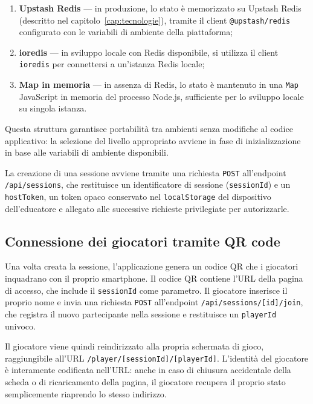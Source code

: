 \documentclass[12pt]{report}
\begin{document}
\begin{enumerate}
    \item \textbf{Upstash Redis} --- in produzione, lo stato è memorizzato su Upstash Redis (descritto nel capitolo~\ref{cap:tecnologie}), tramite il client \texttt{@upstash/redis} configurato con le variabili di ambiente della piattaforma;
    \item \textbf{ioredis} --- in sviluppo locale con Redis disponibile, si utilizza il client \texttt{ioredis} per connettersi a un'istanza Redis locale;
    \item \textbf{Map in memoria} --- in assenza di Redis, lo stato è mantenuto in una \texttt{Map} JavaScript in memoria del processo Node.js, sufficiente per lo sviluppo locale su singola istanza.
\end{enumerate}

Questa struttura garantisce portabilità tra ambienti senza modifiche al codice applicativo: la selezione del livello appropriato avviene in fase di inizializzazione in base alle variabili di ambiente disponibili.

La creazione di una sessione avviene tramite una richiesta \texttt{POST} all'endpoint \texttt{/api/sessions}, che restituisce un identificatore di sessione (\texttt{sessionId}) e un \texttt{hostToken}, un token opaco conservato nel \texttt{localStorage} del dispositivo dell'educatore e allegato alle successive richieste privilegiate per autorizzarle.

\subsection{Connessione dei giocatori tramite QR code}

Una volta creata la sessione, l'applicazione genera un codice QR che i giocatori inquadrano con il proprio smartphone. Il codice QR contiene l'URL della pagina di accesso, che include il \texttt{sessionId} come parametro. Il giocatore inserisce il proprio nome e invia una richiesta \texttt{POST} all'endpoint \texttt{/api/sessions/[id]/join}, che registra il nuovo partecipante nella sessione e restituisce un \texttt{playerId} univoco.

Il giocatore viene quindi reindirizzato alla propria schermata di gioco, raggiungibile all'URL \texttt{/player/[sessionId]/[playerId]}. L'identità del giocatore è interamente codificata nell'URL: anche in caso di chiusura accidentale della scheda o di ricaricamento della pagina, il giocatore recupera il proprio stato semplicemente riaprendo lo stesso indirizzo.
\end{document}
